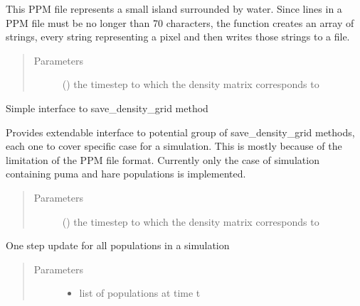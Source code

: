 \documentclass[letterpaper,10pt,english]{sphinxmanual}
\begin{document}
\begin{fulllineitems}
\begin{fulllineitems}
This PPM file represents a small island surrounded by water.
Since lines in a PPM file must be no longer than 70 characters,
the function creates an array of strings, every string representing
a pixel and then writes those strings to a file.
\begin{quote}\begin{description}
\item[{Parameters}] \leavevmode
{} () \textendash{} the timestep to which the density matrix                 corresponds to

\end{description}\end{quote}

\end{fulllineitems}


\begin{fulllineitems}
\label{\detokenize{pumha:pumha.sim.Simulation.save_density_grid_interface}}
Simple interface to save\_density\_grid method

Provides extendable interface to potential group of save\_density\_grid
methods, each one to cover specific case for a simulation. This is
mostly because of the limitation of the PPM file format. Currently only
the case of simulation containing puma and hare populations is
implemented.
\begin{quote}\begin{description}
\item[{Parameters}] \leavevmode
{} () \textendash{} the timestep to which the density                 matrix corresponds to

\end{description}\end{quote}

\end{fulllineitems}


\begin{fulllineitems}
\label{\detokenize{pumha:pumha.sim.Simulation.update}}
One step update for all populations in a simulation
\begin{quote}\begin{description}
\item[{Parameters}] \leavevmode\begin{itemize}
\item {} 
 \textendash{} list of populations at time t


\end{itemize}
\end{description}
\end{quote}
\end{fulllineitems}
\end{fulllineitems}
\end{document}
